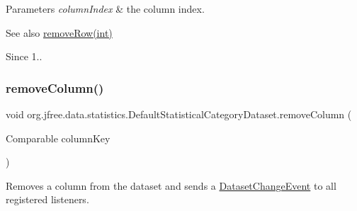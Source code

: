 \begin{DoxyParams}{Parameters}
{\em column\+Index} & the column index.\\
\hline
\end{DoxyParams}
\begin{DoxySeeAlso}{See also}
\mbox{\hyperlink{classorg_1_1jfree_1_1data_1_1statistics_1_1_default_statistical_category_dataset_ab5739fe0b41281d22ec2f4d294379cbb}{remove\+Row(int)}}
\end{DoxySeeAlso}
\begin{DoxySince}{Since}
1.. 
\end{DoxySince}
\mbox{\label{classorg_1_1jfree_1_1data_1_1statistics_1_1_default_statistical_category_dataset_a9677e48208461d7ad22a1d87eb93e6ee}} 
\subsubsection{\texorpdfstring{remove\+Column()}{removeColumn()}\hspace{0.1cm}{\footnotesize\ttfamily [2/2]}}
{\footnotesize\ttfamily void org.\+jfree.\+data.\+statistics.\+Default\+Statistical\+Category\+Dataset.\+remove\+Column (\begin{DoxyParamCaption}\item[{Comparable}]{column\+Key }\end{DoxyParamCaption})}

Removes a column from the dataset and sends a \mbox{\hyperlink{}{Dataset\+Change\+Event}} to all registered listeners.


